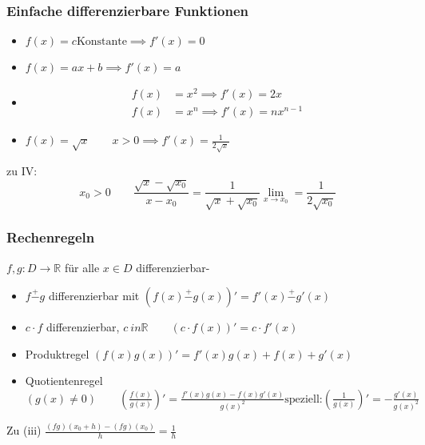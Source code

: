 \subsubsection*{Einfache differenzierbare Funktionen}
\begin{itemize}
	\item \( f(x)=c \text{Konstante} \implies f'(x)=0 \)
	\item \( f(x)=ax+b \implies f'(x)=a \)
	\item \begin{align*}
			f(x)&=x^2 \implies f'(x)=2x \\
			f(x)&=x^n \implies f'(x)=nx^{n-1}
		\end{align*}
	\item \( f(x)=\sqrt{x} \qquad x>0 \implies f'(x)=\frac{1}{2\sqrt{x}} \)
\end{itemize}
zu IV:
\[
x_0>0 \qquad \frac{\sqrt{x}-\sqrt{x_0}}{x-x_0} =\frac{1}{\sqrt{x}+\sqrt{x_0}}\lim\limits_{x \rightarrow x_0}=\frac{1}{2\sqrt{x_0}}
\]

\subsubsection*{Rechenregeln} %
\label{sub:rechenregeln}

\( f,g:D\rightarrow\mathbb{R} \) für alle \( x \in D \) differenzierbar-

\begin{itemize}
	\item \( f \stackrel{+}{-} g \) differenzierbar mit \( (f(x)\stackrel{+}{-}g(x))'=f'(x)\stackrel{+}{-}g'(x) \)
	\item \( c \cdot f \) differenzierbar, \( c \ in \mathbb{R} \qquad (c \cdot f(x))'=c\cdot f'(x) \)
	\item Produktregel \( (f(x)g(x))' = f'(x)g(x)+f(x)+g'(x) \)
	\item Quotientenregel \( (g(x) \neq 0) \qquad (\frac{f(x)}{g(x)})'=\frac{f'(x)g(x)-f(x)g'(x)}{g(x)^2} \text{speziell:} (\frac{1}{g(x)})'=-\frac{g'(x)}{g(x)^2}\)
\end{itemize}

Zu (iii) \( \frac{(fg)(x_0+h)-(fg)(x_0)}{h}=\frac{1}{h} \)
